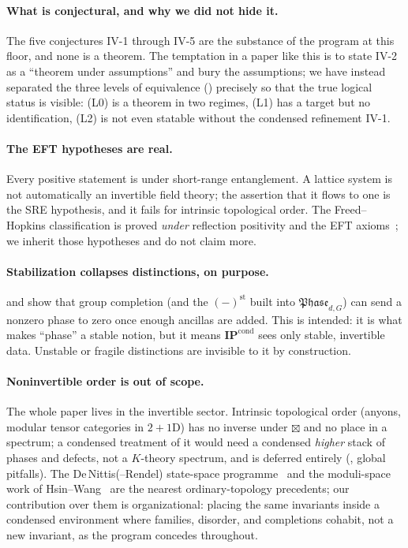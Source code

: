 \documentclass[12pt]{article}
\newcommand{\Phase}{\mathfrak{Phase}}          %
\newcommand{\st}{\mathrm{st}}                  %
\newcommand{\IPcond}{\mathbf{IP}^{\mathrm{cond}}}  %
\theoremstyle{definition}
\theoremstyle{remark}
\theoremstyle{plain}
\begin{document}
\paragraph{What is conjectural, and why we did not hide it.} The five conjectures
IV-1 through IV-5 are the substance of the program at this floor, and none is a
theorem. The temptation in a paper like this is to state IV-2 as a ``theorem
under assumptions'' and bury the assumptions; we have instead separated the three
levels of equivalence () precisely so that the true logical
status is visible: (L0) is a theorem in two regimes, (L1) has a target but no
identification, (L2) is not even statable without the condensed refinement IV-1.

\paragraph{The EFT hypotheses are real.} Every positive statement is under
short-range entanglement. A lattice system is not automatically an invertible
field theory; the assertion that it flows to one is the SRE hypothesis, and it
fails for intrinsic topological order. The Freed--Hopkins classification is proved
\emph{under} reflection positivity and the EFT axioms~\cite{freed-hopkins}; we
inherit those hypotheses and do not claim more.

\paragraph{Stabilization collapses distinctions, on purpose.}
 and  show that group completion (and the
$(-)^{\st}$ built into $\Phase_{d,G}$) can send a nonzero phase to zero once
enough ancillas are added. This is intended: it is what makes ``phase'' a stable
notion, but it means $\IPcond$ sees only stable, invertible data. Unstable or
fragile distinctions are invisible to it by construction.

\paragraph{Noninvertible order is out of scope.} The whole paper lives in the
invertible sector. Intrinsic topological order (anyons, modular tensor categories
in $2{+}1$D) has no inverse under $\boxtimes$ and no place in a spectrum; a
condensed treatment of it would need a condensed \emph{higher} stack of phases and
defects, not a $K$-theory spectrum, and is deferred entirely
(\cite{paperSynthesis}, global pitfalls). The De\,Nittis(--Rendel) state-space
programme~\cite{denittis-states,denittis-rendel-weyl} and the moduli-space work of
Hsin--Wang~\cite{hsin-wang-moduli} are the nearest ordinary-topology precedents;
our contribution over them is organizational: placing the same invariants inside
a condensed environment where families, disorder, and completions cohabit, not a
new invariant, as the program concedes throughout.
\end{document}
